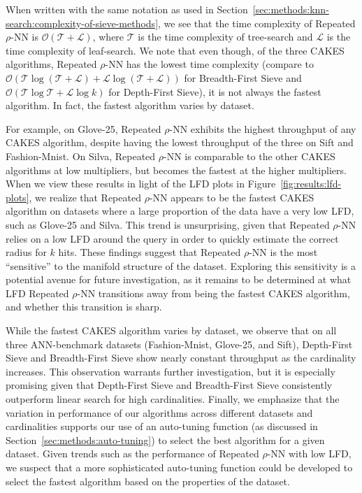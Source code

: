 When written with the same notation as used in Section~\ref{sec:methods:knn-search:complexity-of-sieve-methods}, we see that the time complexity of Repeated $\rho$-NN is $\mathcal{O}(\mathcal{T} + \mathcal{L})$, where $\mathcal{T}$ is the time complexity of tree-search and $\mathcal{L}$ is the time complexity of leaf-search. 
We note that even though, of the three CAKES algorithms, Repeated $\rho$-NN has the lowest time complexity (compare to $\mathcal{O}(\mathcal{T}\log{(\mathcal{T}+\mathcal{L})} + \mathcal{L}\log{(\mathcal{T}+\mathcal{L})})$ for Breadth-First Sieve and $\mathcal{O}(\mathcal{T}\log{\mathcal{T}} + \mathcal{L}\log{k})$ for Depth-First Sieve), it is not always the fastest algorithm. 
In fact, the fastest algorithm varies by dataset.

For example, on Glove-25, Repeated $\rho$-NN exhibits the highest throughput of any CAKES algorithm, despite having the lowest throughput of the three on Sift and Fashion-Mnist.
On Silva, Repeated $\rho$-NN is comparable to the other CAKES algorithms at low multipliers, but becomes the fastest at the higher multipliers.
When we view these results in light of the LFD plots in Figure~\ref{fig:results:lfd-plots}, we realize that Repeated $\rho$-NN appears to be the fastest CAKES algorithm on datasets where a large proportion of the data have a very low LFD, such as Glove-25 and Silva.
This trend is unsurprising, given that Repeated $\rho$-NN relies on a low LFD around the query in order to quickly estimate the correct radius for $k$ hits.
These findings suggest that Repeated $\rho$-NN is the most ``sensitive'' to the manifold structure of the dataset.
Exploring this sensitivity is a potential avenue for future investigation, as it remains to be determined at what LFD Repeated $\rho$-NN transitions away from being the fastest CAKES algorithm, and whether this transition is sharp.

While the fastest CAKES algorithm varies by dataset, we observe that on all three ANN-benchmark datasets (Fashion-Mnist, Glove-25, and Sift), Depth-First Sieve and Breadth-First Sieve show nearly constant throughput as the cardinality increases.
This observation warrants further investigation, but it is especially promising given that Depth-First Sieve and Breadth-First Sieve consistently outperform linear search for high cardinalities.
Finally, we emphasize that the variation in performance of our algorithms across different datasets and cardinalities supports our use of an auto-tuning function (as discussed in Section~\ref{sec:methods:auto-tuning}) to select the best algorithm for a given dataset.
Given trends such as the performance of Repeated $\rho$-NN with low LFD, we suspect that a more sophisticated auto-tuning function could be developed to select the fastest algorithm based on the properties of the dataset.

